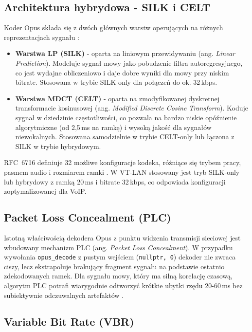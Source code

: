 \subsection*{Architektura hybrydowa - SILK i CELT}

Koder Opus składa się z dwóch głównych warstw operujących na różnych
reprezentacjach sygnału \cite{OpusRFC}:

\begin{itemize}
	\item \textbf{Warstwa LP (SILK)} - oparta na liniowym przewidywaniu
	(ang. \textit{Linear Prediction}). Modeluje sygnał mowy jako pobudzenie
	filtra autoregresyjnego, co jest wydajne obliczeniowo i daje dobre wyniki
	dla mowy przy niskim bitrate. Stosowana w trybie SILK-only dla połączeń
	do ok. 32\,kbps.
	
	\item \textbf{Warstwa MDCT (CELT)} - oparta na zmodyfikowanej dyskretnej
	transformacie kosinusowej (ang. \textit{Modified Discrete Cosine Transform}).
	Koduje sygnał w dziedzinie częstotliwości, co pozwala na bardzo niskie
	opóźnienie algorytmiczne (od 2,5\,ms na ramkę) i wysoką jakość dla
	sygnałów niewokalnych. Stosowana samodzielnie w trybie CELT-only lub
	łączona z SILK w trybie hybrydowym.
\end{itemize}

RFC~6716 definiuje 32 możliwe konfiguracje kodeka, różniące się trybem
pracy, pasmem audio i rozmiarem ramki \cite{OpusRFC}. W VT-LAN stosowany
jest tryb SILK-only lub hybrydowy z ramką 20\,ms i bitrate 32\,kbps,
co odpowiada konfiguracji zoptymalizowanej dla VoIP.

\subsection*{Packet Loss Concealment (PLC)}

Istotną właściwością dekodera Opus z punktu widzenia transmisji sieciowej
jest wbudowany mechanizm PLC (ang. \textit{Packet Loss Concealment}).
W przypadku wywołania \texttt{opus\_decode} z pustym wejściem
(\texttt{nullptr, 0}) dekoder nie zwraca ciszy, lecz ekstrapoluje brakujący
fragment sygnału na podstawie ostatnio zdekodowanych ramek. Dla sygnału
mowy, który ma silną korelację czasową, algorytm PLC potrafi wiarygodnie
odtworzyć krótkie ubytki rzędu 20-60\,ms bez subiektywnie odczuwalnych
artefaktów \cite{OpusRFC}.

\subsection*{Variable Bit Rate (VBR)}

